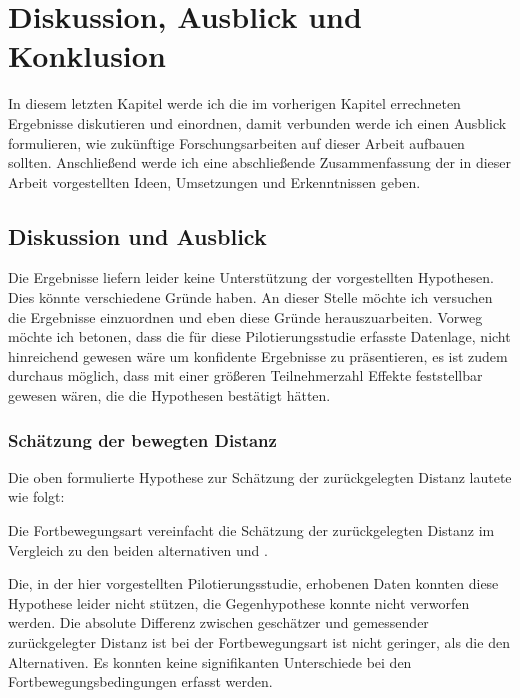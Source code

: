 

\chapter{Diskussion, Ausblick und Konklusion}\label{chapter:discussion-conclusion}
    In diesem letzten Kapitel werde ich die im vorherigen Kapitel errechneten Ergebnisse diskutieren und einordnen, damit verbunden werde ich einen Ausblick formulieren, wie zukünftige Forschungsarbeiten auf dieser Arbeit aufbauen sollten. Anschließend werde ich eine abschließende Zusammenfassung der in dieser Arbeit vorgestellten Ideen, Umsetzungen und Erkenntnissen geben.

    \section{Diskussion und Ausblick}
        Die Ergebnisse liefern leider keine Unterstützung der vorgestellten Hypothesen. Dies könnte verschiedene Gründe haben. An dieser Stelle möchte ich versuchen die Ergebnisse einzuordnen und eben diese Gründe herauszuarbeiten.
        Vorweg möchte ich betonen, dass die für diese Pilotierungsstudie erfasste Datenlage, nicht hinreichend gewesen wäre um konfidente Ergebnisse zu präsentieren, es ist zudem  durchaus möglich, dass mit einer größeren Teilnehmerzahl Effekte feststellbar gewesen wären, die die Hypothesen bestätigt hätten.

        \subsection{Schätzung der bewegten Distanz}
            Die oben formulierte Hypothese zur Schätzung der zurückgelegten Distanz lautete wie folgt:

            Die  Fortbewegungsart vereinfacht die Schätzung der zurückgelegten Distanz im Vergleich zu den beiden alternativen  und .

            Die, in der hier vorgestellten Pilotierungsstudie, erhobenen Daten konnten diese Hypothese leider nicht stützen, die Gegenhypothese konnte nicht verworfen werden. Die absolute Differenz zwischen geschätzer und gemessender zurückgelegter Distanz ist bei der Fortbewegungsart  ist nicht geringer, als die den Alternativen. Es konnten keine signifikanten  Unterschiede bei den Fortbewegungsbedingungen erfasst werden.

